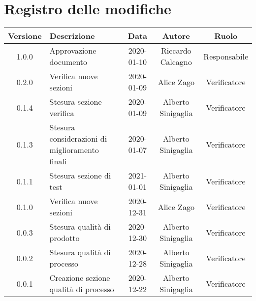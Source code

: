 \section*{Registro delle modifiche}

\begin{center}
	\begin{longtable}{|c|p{5cm}|c|c|c|}
	\hline
	\rowcolor{lighter-grayer}
	\textbf{Versione} & \textbf{Descrizione} & \textbf{Data} & \textbf{Autore} & \textbf{Ruolo} \\
	\hline
	\endfirsthead


	1.0.0 & Approvazione documento & 2020-01-10 & Riccardo Calcagno & Responsabile \\
	\hline
	0.2.0 & Verifica nuove sezioni & 2020-01-09 & Alice Zago & Verificatore \\
	\hline
	0.1.4 & Stesura sezione verifica & 2020-01-09 & Alberto Sinigaglia & Verificatore \\
	\hline
	0.1.3 & Stesura considerazioni di miglioramento finali & 2020-01-07 & Alberto Sinigaglia & Verificatore \\
	\hline
	0.1.1 & Stesura sezione di test & 2021-01-01 & Alberto Sinigaglia & Verificatore \\
	\hline
	0.1.0 & Verifica nuove sezioni & 2020-12-31 & Alice Zago & Verificatore \\
	\hline
	0.0.3 & Stesura qualità di prodotto & 2020-12-30 & Alberto Sinigaglia & Verificatore \\
	\hline
	0.0.2 & Stesura qualità di processo & 2020-12-28 & Alberto Sinigaglia & Verificatore \\
	\hline
	0.0.1 & Creazione sezione qualità di processo & 2020-12-22 & Alberto Sinigaglia & Verificatore \\
	\hline

	\end{longtable}
\end{center}